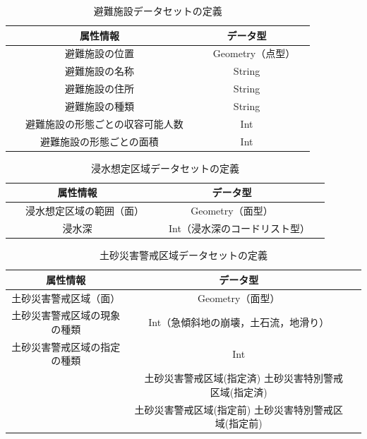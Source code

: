 \documentclass[a4paper]{jsarticle}
\begin{document}
\begin{table}[H]
  \begin{center}
    \caption{避難施設データセットの定義}
    \renewcommand\arraystretch{1.4}
    \begin{tabular}{|c|c|c|}
      \hline
      属性情報 & データ型 \\
      \hline
      \hline
      避難施設の位置 & 　Geometry（点型）　 \\
      \hline
      避難施設の名称 & String \\
      \hline
      避難施設の住所 & String \\
      \hline
      避難施設の種類 & String \\
      \hline
      　避難施設の形態ごとの収容可能人数　 & Int \\
      \hline
      避難施設の形態ごとの面積 & Int  \\
      \hline
    \end{tabular}
    \label{tab:database-facility}
  \end{center}
\end{table}

\begin{table}[H]
  \begin{center}
    \caption{浸水想定区域データセットの定義}
    \renewcommand\arraystretch{1.4}
    \begin{tabular}{|c|c|c|}
      \hline
      属性情報 & データ型 \\
      \hline
      \hline
      　浸水想定区域の範囲（面）　 & Geometry（面型） \\
      \hline
      浸水深 & 　Int（浸水深のコードリスト型）　\\
      \hline
    \end{tabular}
    \label{tab:database-flood}
  \end{center}
\end{table}

\begin{table}[H]
  \begin{center}
    \caption{土砂災害警戒区域データセットの定義}
    \renewcommand\arraystretch{1.4}
    \begin{tabular}{|c|c|c|}
      \hline
      属性情報 & データ型 \\
      \hline
      \hline
      土砂災害警戒区域（面） & Geometry（面型） \\
      \hline
      土砂災害警戒区域の現象の種類 & Int（急傾斜地の崩壊，土石流，地滑り）\\
      \hline
      土砂災害警戒区域の指定の種類 & Int \\
      & 　土砂災害警戒区域(指定済) 土砂災害特別警戒区域(指定済)　 \\
      & 土砂災害警戒区域(指定前) 土砂災害特別警戒区域(指定前) \\
      \hline
    \end{tabular}
    \label{tab:database-sediment}
  \end{center}
\end{table}
\end{document}
